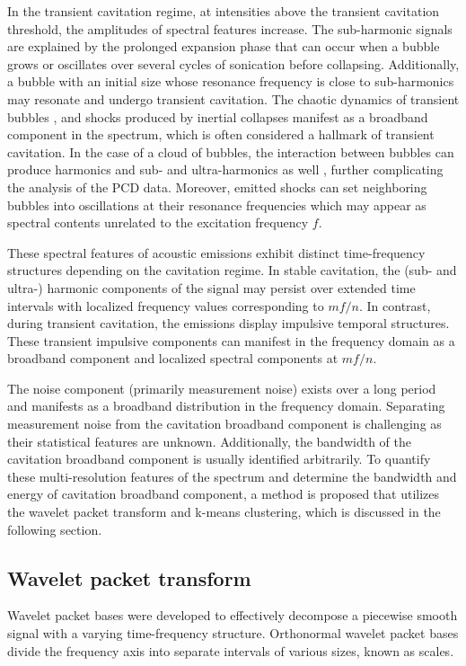 \documentclass[preprint, linenumbers]{revtex4-2}
\newcommand{\km}{k-means }
\begin{document}
In the transient cavitation regime, at intensities above the transient cavitation threshold, the amplitudes of spectral features increase. The sub-harmonic signals are explained by the prolonged expansion phase that can occur when a bubble grows or oscillates over several cycles of sonication before collapsing. Additionally, a bubble with an initial size whose resonance frequency is close to sub-harmonics may resonate and undergo transient cavitation. The chaotic dynamics of transient bubbles \cite{lauterborn2015}, and shocks produced by inertial collapses manifest as a broadband component in the spectrum, which is often considered a hallmark of transient cavitation. \cite{frohly2000} In the case of a cloud of bubbles, the interaction between bubbles can produce harmonics and sub- and ultra-harmonics as well \cite{yasui2010}, further complicating the analysis of the PCD data. Moreover, emitted shocks can set neighboring bubbles into oscillations at their resonance frequencies which may appear as spectral contents unrelated to the excitation frequency $f$.

These spectral features of acoustic emissions exhibit distinct time-frequency structures depending on the cavitation regime. In stable cavitation, the (sub- and ultra-) harmonic components of the signal may persist over extended time intervals with localized frequency values corresponding to $mf/n$. In contrast, during transient cavitation, the emissions display impulsive temporal structures. These transient impulsive components can manifest in the frequency domain as a broadband component and localized spectral components at $mf/n$. 

The noise component (primarily measurement noise) exists over a long period and manifests as a broadband distribution in the frequency domain. Separating measurement noise from the cavitation broadband component is challenging as their statistical features are unknown. Additionally, the bandwidth of the cavitation broadband component is usually identified arbitrarily. To quantify these multi-resolution features of the spectrum and determine the bandwidth and energy of cavitation broadband component, a method is proposed that utilizes the wavelet packet transform and \km clustering, which is discussed in the following section. 

\subsection{Wavelet packet transform}\label{sec:WPT}
Wavelet packet bases were developed to effectively decompose a piecewise smooth signal with a varying time-frequency structure. Orthonormal wavelet packet bases divide the frequency axis into separate intervals of various sizes, known as scales. 
 
\end{document}
